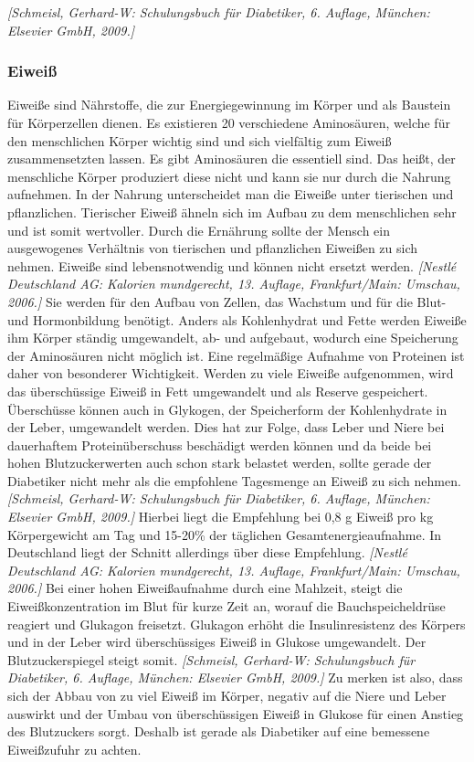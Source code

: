 \documentclass[a4paper,11pt]{article}%
\renewcommand{\\}{\vspace*{0.5\baselineskip} \newline}
\begin{document}
		\emph{[Schmeisl, Gerhard-W: Schulungsbuch für Diabetiker, 6. Auflage, München: Elsevier GmbH, 2009.]}
		
	\subsubsection{Eiweiß}
		Eiweiße sind Nährstoffe, die zur Energiegewinnung im Körper und als Baustein für Körperzellen dienen. Es existieren 20 verschiedene Aminosäuren, welche für den menschlichen Körper wichtig sind und sich vielfältig zum Eiweiß zusammensetzten lassen. Es gibt Aminosäuren die essentiell sind. Das heißt, der menschliche Körper produziert diese nicht und kann sie nur durch die Nahrung aufnehmen. In der Nahrung unterscheidet man die Eiweiße unter tierischen und pflanzlichen. Tierischer Eiweiß ähneln sich im Aufbau zu dem menschlichen sehr und ist somit wertvoller. Durch die Ernährung sollte der Mensch ein ausgewogenes Verhältnis von tierischen und pflanzlichen Eiweißen zu sich nehmen. Eiweiße sind lebensnotwendig und können nicht ersetzt werden. \emph{[Nestlé Deutschland AG: Kalorien mundgerecht, 13. Auflage, Frankfurt/Main: Umschau, 2006.]}
		Sie werden für den Aufbau von Zellen, das Wachstum und für die Blut- und Hormonbildung benötigt. \newline
		Anders als Kohlenhydrat und Fette werden Eiweiße ihm Körper ständig umgewandelt, ab- und aufgebaut, wodurch eine Speicherung der Aminosäuren nicht möglich ist. Eine regelmäßige Aufnahme von Proteinen ist daher von besonderer Wichtigkeit. \newline
		Werden zu viele Eiweiße aufgenommen, wird das überschüssige Eiweiß in Fett umgewandelt und als Reserve gespeichert. Überschüsse können auch in Glykogen, der Speicherform der Kohlenhydrate in der Leber, umgewandelt werden. Dies hat zur Folge, dass Leber und Niere bei dauerhaftem Proteinüberschuss beschädigt werden können und da beide bei hohen Blutzuckerwerten auch schon stark belastet werden, sollte gerade der Diabetiker nicht mehr als die empfohlene Tagesmenge an Eiweiß zu sich nehmen. \emph{[Schmeisl, Gerhard-W: Schulungsbuch für Diabetiker, 6. Auflage, München: Elsevier GmbH, 2009.]} Hierbei liegt die Empfehlung bei 0,8 g Eiweiß pro kg Körpergewicht am Tag und 15-20\% der täglichen Gesamtenergieaufnahme. In Deutschland liegt der Schnitt allerdings über diese Empfehlung. \emph{[Nestlé Deutschland AG: Kalorien mundgerecht, 13. Auflage, Frankfurt/Main: Umschau, 2006.]}
		\newline
		Bei einer hohen Eiweißaufnahme durch eine Mahlzeit, steigt die Eiweißkonzentration im Blut für kurze Zeit an, worauf die Bauchspeicheldrüse reagiert und Glukagon freisetzt. Glukagon erhöht die Insulinresistenz des Körpers und in der Leber wird überschüssiges Eiweiß in Glukose umgewandelt. Der Blutzuckerspiegel steigt somit. \emph{[Schmeisl, Gerhard-W: Schulungsbuch für Diabetiker, 6. Auflage, München: Elsevier GmbH, 2009.]}
		\\
		Zu merken ist also, dass sich der Abbau von zu viel Eiweiß im Körper, negativ auf die Niere und Leber auswirkt und der Umbau von überschüssigen Eiweiß in Glukose für einen Anstieg des Blutzuckers sorgt. Deshalb ist gerade als Diabetiker auf eine bemessene Eiweißzufuhr zu achten.
\end{document}
